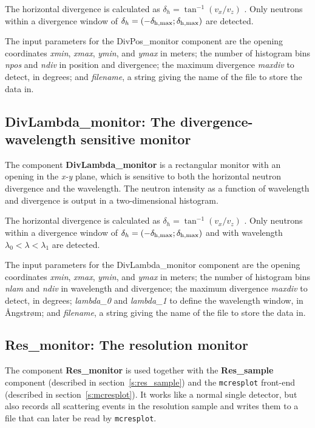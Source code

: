 The horizontal divergence is calculated as $\delta_h = \tan^{-1}(v_x/v_z)$ .
Only neutrons within a divergence window of 
$\delta_h = (-\delta_{\rm h,max} ; \delta_{\rm h,max})$ are detected.

The input parameters for the DivPos\_monitor component are the opening coordinates
\textit{xmin}, \textit{xmax}, \textit{ymin}, and
\textit{ymax} in meters;
the number of histogram bins \textit{npos} and \textit{ndiv} in
position and divergence; the maximum divergence \textit{maxdiv} to
detect, in degrees; and \textit{filename}, a
string giving the name of the file to store the data in.


\subsection{DivLambda\_monitor: The divergence-wavelength sensitive monitor}

The component {\bf DivLambda\_monitor} is a rectangular monitor
with an opening in the \textit{x-y} plane,
which is sensitive to both the horizontal neutron divergence and the
wavelength. The neutron intensity as a function of wavelength and
divergence is output in a two-dimensional histogram.
 
The horizontal divergence is calculated as $\delta_h = \tan^{-1}(v_x/v_z)$ .
Only neutrons within a divergence window of 
$\delta_h = (-\delta_{\rm h,max} ; \delta_{\rm h,max})$ and with
wavelength $\lambda_0 < \lambda < \lambda_1$ are detected.

The input parameters for the DivLambda\_monitor component are the opening coordinates
\textit{xmin}, \textit{xmax}, \textit{ymin}, and
\textit{ymax} in meters;
the number of histogram bins \textit{nlam} and \textit{ndiv} in
wavelength and divergence; the maximum divergence \textit{maxdiv} to
detect, in degrees; \textit{lambda\_0} and \textit{lambda\_1} to define
the wavelength window, in {\AA}ngstr{\o}m; and \textit{filename}, a
string giving the name of the file to store the data in.





\subsection{Res\_monitor: The resolution monitor}
\label{s:res_monitor}
The component \textbf{Res\_monitor} is used together with the
\textbf{Res\_sample} component (described in section~\ref{s:res_sample})
and the \verb+mcresplot+ front-end (described in
section~\ref{s:mcresplot}). It works like a normal single detector, but
also records all scattering events in the resolution sample and writes
them to a file that can later be read by \verb+mcresplot+.

